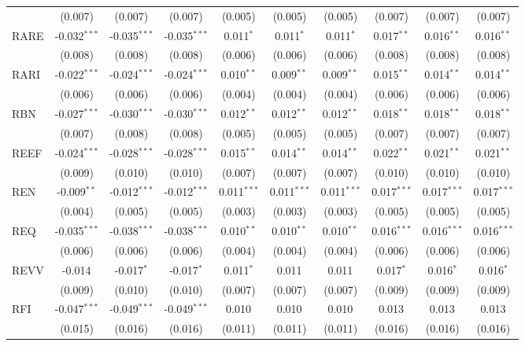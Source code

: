 \begin{table}[!htbp]
\begin{tabular}{@{\extracolsep{5pt}}lccccccccc}
  & (0.007) & (0.007) & (0.007) & (0.005) & (0.005) & (0.005) & (0.007) & (0.007) & (0.007) \\
 RARE & -0.032$^{***}$ & -0.035$^{***}$ & -0.035$^{***}$ & 0.011$^{*}$ & 0.011$^{*}$ & 0.011$^{*}$ & 0.017$^{**}$ & 0.016$^{**}$ & 0.016$^{**}$ \\
  & (0.008) & (0.008) & (0.008) & (0.006) & (0.006) & (0.006) & (0.008) & (0.008) & (0.008) \\
 RARI & -0.022$^{***}$ & -0.024$^{***}$ & -0.024$^{***}$ & 0.010$^{**}$ & 0.009$^{**}$ & 0.009$^{**}$ & 0.015$^{**}$ & 0.014$^{**}$ & 0.014$^{**}$ \\
  & (0.006) & (0.006) & (0.006) & (0.004) & (0.004) & (0.004) & (0.006) & (0.006) & (0.006) \\
 RBN & -0.027$^{***}$ & -0.030$^{***}$ & -0.030$^{***}$ & 0.012$^{**}$ & 0.012$^{**}$ & 0.012$^{**}$ & 0.018$^{**}$ & 0.018$^{**}$ & 0.018$^{**}$ \\
  & (0.007) & (0.008) & (0.008) & (0.005) & (0.005) & (0.005) & (0.007) & (0.007) & (0.007) \\
 REEF & -0.024$^{***}$ & -0.028$^{***}$ & -0.028$^{***}$ & 0.015$^{**}$ & 0.014$^{**}$ & 0.014$^{**}$ & 0.022$^{**}$ & 0.021$^{**}$ & 0.021$^{**}$ \\
  & (0.009) & (0.010) & (0.010) & (0.007) & (0.007) & (0.007) & (0.010) & (0.010) & (0.010) \\
 REN & -0.009$^{**}$ & -0.012$^{***}$ & -0.012$^{***}$ & 0.011$^{***}$ & 0.011$^{***}$ & 0.011$^{***}$ & 0.017$^{***}$ & 0.017$^{***}$ & 0.017$^{***}$ \\
  & (0.004) & (0.005) & (0.005) & (0.003) & (0.003) & (0.003) & (0.005) & (0.005) & (0.005) \\
 REQ & -0.035$^{***}$ & -0.038$^{***}$ & -0.038$^{***}$ & 0.010$^{**}$ & 0.010$^{**}$ & 0.010$^{**}$ & 0.016$^{***}$ & 0.016$^{***}$ & 0.016$^{***}$ \\
  & (0.006) & (0.006) & (0.006) & (0.004) & (0.004) & (0.004) & (0.006) & (0.006) & (0.006) \\
 REVV & -0.014$^{}$ & -0.017$^{*}$ & -0.017$^{*}$ & 0.011$^{*}$ & 0.011$^{}$ & 0.011$^{}$ & 0.017$^{*}$ & 0.016$^{*}$ & 0.016$^{*}$ \\
  & (0.009) & (0.010) & (0.010) & (0.007) & (0.007) & (0.007) & (0.009) & (0.009) & (0.009) \\
 RFI & -0.047$^{***}$ & -0.049$^{***}$ & -0.049$^{***}$ & 0.010$^{}$ & 0.010$^{}$ & 0.010$^{}$ & 0.013$^{}$ & 0.013$^{}$ & 0.013$^{}$ \\
  & (0.015) & (0.016) & (0.016) & (0.011) & (0.011) & (0.011) & (0.016) & (0.016) & (0.016) \\

\end{tabular}
\end{table}
